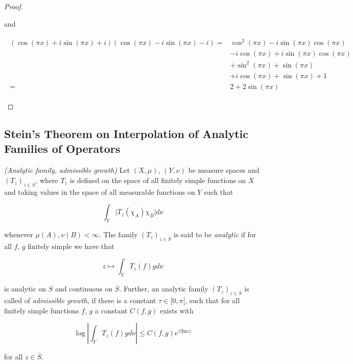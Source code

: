 \begin{proof}
\begin{enumerate}[label = \textbf{(\roman*.)}]
	and

	\begin{gather*}
		\begin{aligned}
			\left( \cos(\pi x) + i\sin(\pi x) + i \right)\left( \cos(\pi x) - i\sin(\pi x) - i \right) =& \cos^2(\pi x) - i\sin(\pi x)\cos(\pi x)\\
			& -i\cos(\pi x) + i\sin(\pi x)\cos(\pi x)\\
			& + \sin^2(\pi x) + \sin(\pi x)\\
			& + i \cos(\pi x) + \sin(\pi x) + 1\\
			=& 2 + 2\sin(\pi x)
		\end{aligned}
	\end{gather*}


	\end{enumerate}
\end{proof}

\subsection{Stein's Theorem on Interpolation of Analytic Families of Operators}

\begin{mdframed}
	\begin{definition}\emph{(Analytic family, admissible growth)}
		Let $(X,\mu)$, $(Y,\nu)$ be measure spaces and $\left( T_z \right)_{z \in \overline{S}}$, where $T_z$ is defined on the space of all finitely simple functions on $X$ and taking values in the space of all measurable functions on $Y$ such that

		\begin{equation}
			\int_Y \vert T_z(\chi_A)\chi_B \vert d\nu
		\end{equation}

		whenever $\mu(A),\nu(B) < \infty$. The family $\left( T_z \right)_{z \in \overline{S}}$ is said to be \emph{analytic} if for all $f$, $g$ finitely simple we have that

		\begin{equation}
			z \mapsto \int_Y T_z(f)gd\nu
		\end{equation}

		is analytic on $S$ and continuous on $\overline{S}$. Further, an analytic family $\left( T_z \right)_{z \in \overline{S}}$ is called of \emph{admissible growth}, if there is a constant $\tau \in [0,\pi[$, such that for all finitely simple functions $f$, $g$ a constant $C(f,g)$ exists with

			\begin{equation}
				\log\left\vert \int_Y T_z(f) g d\nu\right\vert \leqslant C(f,g)e^{\tau\vert \mathrm{Im}z\vert}
			\end{equation}

			for all $z \in \overline{S}$.
	\end{definition}
\end{mdframed}

